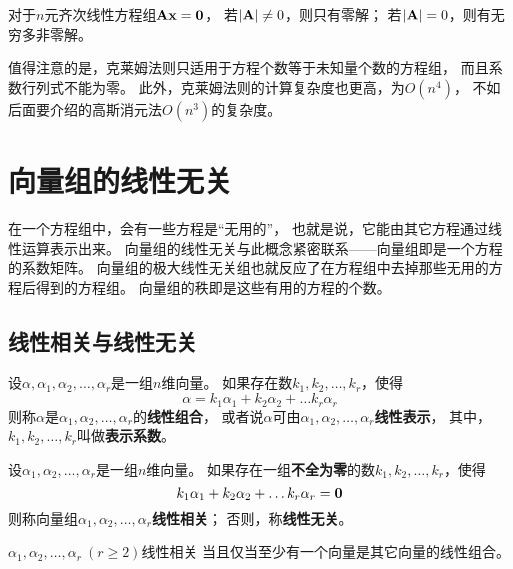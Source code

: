 \begin{corollary}
  对于$n$元齐次线性方程组$\mathbf{A}\mathbf{x}=\mathbf{0}$，
  若$|\mathbf{A}|\neq 0$，则只有零解；
  若$|\mathbf{A}| = 0$，则有无穷多非零解。
\end{corollary}

\begin{remark}
  值得注意的是，克莱姆法则只适用于方程个数等于未知量个数的方程组，
  而且系数行列式不能为零。
  此外，克莱姆法则的计算复杂度也更高，为$O(n^4)$，
  不如后面要介绍的高斯消元法$O(n^3)$的复杂度。
\end{remark}

\section{向量组的线性无关}
在一个方程组中，会有一些方程是``无用的''，
也就是说，它能由其它方程通过线性运算表示出来。
向量组的线性无关与此概念紧密联系——向量组即是一个方程的系数矩阵。
向量组的极大线性无关组也就反应了在方程组中去掉那些无用的方程后得到的方程组。
向量组的秩即是这些有用的方程的个数。

\subsection{线性相关与线性无关}
\begin{definition}[线性表示]
  设$\alpha,\alpha_1,\alpha_2,\dots,\alpha_r$是一组$n$维向量。
  如果存在数$k_1,k_2,\dots,k_r$，使得
  \[ \alpha = k_1\alpha_1+k_2\alpha_2+\dots k_r\alpha_r \]
  则称$\alpha$是$\alpha_1,\alpha_2,\dots,\alpha_r$的\textbf{线性组合}，
  或者说$\alpha$可由$\alpha_1,\alpha_2,\dots,\alpha_r$\textbf{线性表示}，
  其中，$k_1,k_2,\dots,k_r$叫做\textbf{表示系数}。
\end{definition}

\begin{definition}[线性相关与线性无关]
  设$\alpha_1,\alpha_2,\dots,\alpha_r$是一组$n$维向量。
  如果存在一组\textbf{不全为零}的数$k_1,k_2,\dots,k_r$，使得
  \[ k_1\alpha_1+k_2\alpha_2+\dots k_r\alpha_r = \mathbf{0} \]
  则称向量组$\alpha_1,\alpha_2,\dots,\alpha_r$\textbf{线性相关}；
  否则，称\textbf{线性无关}。
\end{definition}

\begin{theorem}[线性相关与线性组合]
    $\alpha_1,\alpha_2,\dots,\alpha_r\ (r\ge 2)$线性相关
    当且仅当至少有一个向量是其它向量的线性组合。
\end{theorem}

